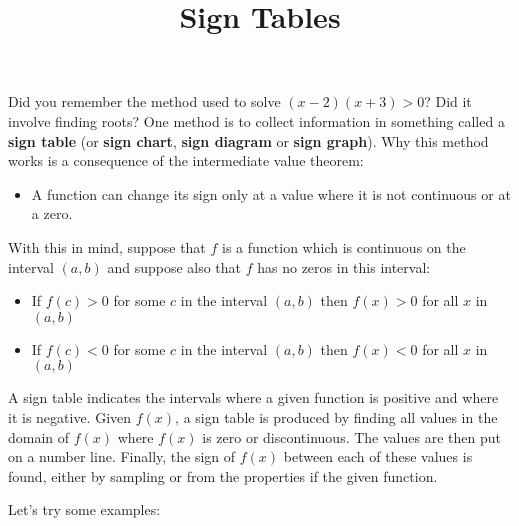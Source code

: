 \documentclass{ximera}
\title[Dig-In:]{Sign Tables}
\begin{document}
\begin{abstract}

\end{abstract}
\maketitle

Did you remember the method used to solve $(x-2)(x+3)>0$? Did it involve finding roots? One method is to collect information 
in something called a {\bf sign table} (or {\bf sign chart}, {\bf sign diagram} or {\bf sign graph}). Why this method works is a 
consequence of the intermediate value theorem:

\begin{itemize}
\item A function can change its sign only at a value where it is not continuous or at a zero. 
\end{itemize}

With this in mind, suppose that $f$ is a function which is continuous on the interval $(a,b)$ and suppose also that $f$ has no zeros in this interval:

\begin{itemize}
\item If $f(c)>0$ for some $c$ in the interval $(a,b)$ then $f(x)>0$ for all $x$ in $(a,b)$
\item If $f(c)<0$ for some $c$ in the interval $(a,b)$ then $f(x)<0$ for all $x$ in $(a,b)$
\end{itemize}

A sign table indicates the intervals where a given function is positive and where it is negative. Given $f(x)$, a sign table is produced by 
finding all values in the domain of $f(x)$ where $f(x)$ is zero or discontinuous. The values are then put on a number line. Finally, the sign of $f(x)$ between 
each of these values is found, either by sampling or from the properties if the given function.

Let's try some examples:
\end{document}
